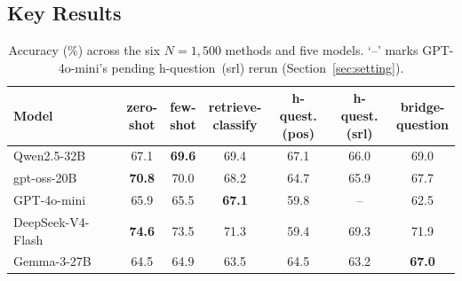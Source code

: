 \documentclass[11pt]{article}
\begin{document}
\subsection{Key Results}

\begin{table}[t]
\centering
\small
\renewcommand{\arraystretch}{0.92}
\setlength{\tabcolsep}{3.5pt}
\begin{tabular}{lcccccc}
\toprule
Model & \makecell{zero-\\shot} & \makecell{few-\\shot} & \makecell{retrieve-\\classify} & \makecell{h-quest.\\(pos)} & \makecell{h-quest.\\(srl)} & \makecell{bridge-\\question} \\
\midrule
Qwen2.5-32B        & 67.1         & \textbf{69.6} & 69.4 & 67.1 & 66.0 & 69.0 \\
gpt-oss-20B        & \textbf{70.8} & 70.0         & 68.2 & 64.7 & 65.9 & 67.7 \\
GPT-4o-mini        & 65.9         & 65.5          & \textbf{67.1} & 59.8 & -- & 62.5 \\
DeepSeek-V4-Flash  & \textbf{74.6} & 73.5         & 71.3 & 59.4 & 69.3 & 71.9 \\
Gemma-3-27B        & 64.5         & 64.9          & 63.5 & 64.5 & 63.2 & \textbf{67.0} \\
\bottomrule
\end{tabular}
\caption{Accuracy (\%) across the six $N=1{,}500$ methods and five models.
`--' marks GPT-4o-mini's pending h-question~(srl) rerun
(Section~\ref{sec:setting}).}
\label{tab:main-results}
\end{table}
\end{document}
